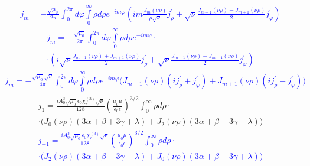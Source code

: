 \textcolor{blue} { \begin{equation*} \begin{aligned}
j_m = - \frac{\sqrt{\mu_0}}{2\pi} 
\int_0^{2\pi} d \varphi \int \limits_0^\infty \rho d \rho
e^{-im\varphi} \left( i m \frac{J_m (\nu \rho)}{\rho \sqrt{\nu}}
j_\rho^\prime + \sqrt{\nu}
\frac{J_{m-1} (\nu \rho) - J_{m+1} (\nu \rho)}{2}
j_\varphi^\prime \right)
\end{aligned} \end{equation*} }
%
\textcolor{blue} { \begin{equation*} \begin{aligned}
j_m = - \frac{\sqrt{\mu_0}}{2\pi} 
\int_0^{2\pi} d \varphi \int \limits_0^\infty \rho d \rho 
e^{-im\varphi} \cdot \\ \cdot 
\left( i \sqrt{\nu} \frac{J_{m-1} (\nu \rho) + J_{m+1} (\nu \rho)}{2}
j_\rho^\prime + \sqrt{\nu} 
\frac{J_{m-1} (\nu \rho) - J_{m+1} (\nu \rho)}{2}
j_\varphi^\prime \right)
\end{aligned} \end{equation*} }
%
\textcolor{blue} { \begin{equation*} \begin{aligned}
j_m = - \frac{\sqrt{\mu_0} \sqrt{\nu}}{4\pi} 
\int_0^{2\pi} d \varphi \int \limits_0^\infty \rho d \rho 
e^{-im\varphi} \Big(
J_{m-1} (\nu \rho) ( i j_\rho^\prime + j_\varphi^\prime ) +
J_{m+1} (\nu \rho) ( i j_\rho^\prime - j_\varphi^\prime ) \Big)
\end{aligned} \end{equation*} }
%
\begin{equation} \begin{aligned}
j_1 = \frac{i A_0^3 \sqrt{\mu_0} \epsilon_0 \chi_e^{(3)} \sqrt{\nu}}{128}
\left( \frac{\mu_0 \mu}{\epsilon_0 \epsilon} \right)^{3/2}
\int_0^\infty \rho d \rho \cdot \\ \cdot
\Big( J_0 (\nu \rho) ( 3 \alpha + \beta + 3 \gamma + \lambda) + 
J_2 (\nu \rho) ( 3 \alpha + \beta - 3 \gamma - \lambda ) \Big)
\end{aligned} \end{equation}
%
\textcolor{blue} { \begin{equation*} \begin{aligned}
j_{-1} = \frac{i A_0^3 \sqrt{\mu_0} \epsilon_0 \chi_e^{(3)} \sqrt{\nu}}{128}
\left( \frac{\mu_0 \mu}{\epsilon_0 \epsilon} \right)^{3/2}
\int_0^\infty \rho d \rho \cdot \\ \cdot
\Big( J_2 (\nu \rho) ( 3 \alpha + \beta - 3 \gamma - \lambda ) + 
J_0 (\nu \rho) ( 3 \alpha + \beta + 3 \gamma + \lambda ) \Big)
\end{aligned} \end{equation*} }
